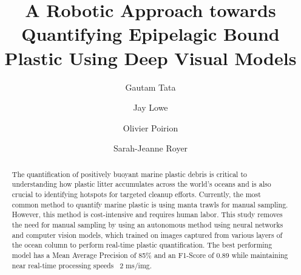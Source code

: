 \documentclass[a4paper,fleqn]{cas-dc}
\begin{document}
\let\WriteBookmarks\relax
\def\floatpagepagefraction{1}
\def\textpagefraction{.001}

\title [mode = title]{A Robotic Approach towards Quantifying Epipelagic Bound Plastic Using Deep Visual Models
}                      


\author[1]{Gautam Tata}
\cormark[1]
\fnmark[1, 3]


\address[1]{California State University, Monterey Bay}

\author[1]{Jay Lowe}
\fnmark[2]



\author[2]{Olivier Poirion}
\fnmark[2]
\address[2]{The Jackson Laboratory, Connecticut, United States of America
}


\author [3]
{Sarah-Jeanne Royer}
\cormark[3]
\fnmark[1,3]

\address[3]{Scripps Institution of Oceanography, San Diego, California, United States of America 
}
\address[3]{The Ocean Cleanup Foundation, Rotterdam, The Netherlands}
\address[3]{Center for Marine Debris Research, Hawaii Pacific University, Waimanalo 96795, Hawaii, United States of America}




\begin{abstract}
The quantification of positively buoyant marine plastic debris is critical to understanding how plastic litter accumulates across the world's oceans and is also crucial to identifying hotspots for targeted cleanup efforts. Currently, the most common method to quantify marine plastic is using manta trawls for manual sampling. However, this method is cost-intensive and requires human labor. This study removes the need for manual sampling by using an autonomous method using neural networks and computer vision models, which trained on images captured from various layers of the ocean column to perform real-time plastic quantification. The best performing model has a Mean Average Precision of 85\% and an F1-Score of 0.89 while maintaining near real-time processing speeds ~2 ms/img.



\end{abstract}
\end{document}
